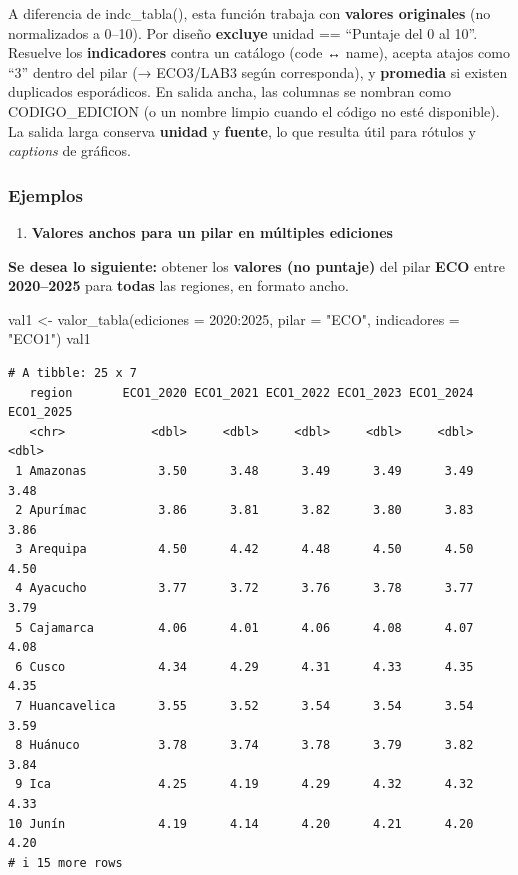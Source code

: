 \documentclass[
  11pt,
  letterpaper,
  DIV=11,
  numbers=noendperiod]{scrartcl}
\newenvironment{Shaded}{\begin{snugshade}}{\end{snugshade}}
\newcommand{\AttributeTok}[1]{\textcolor[rgb]{0.40,0.45,0.13}{#1}}
\newcommand{\DecValTok}[1]{\textcolor[rgb]{0.68,0.00,0.00}{#1}}
\newcommand{\FunctionTok}[1]{\textcolor[rgb]{0.28,0.35,0.67}{#1}}
\newcommand{\NormalTok}[1]{\textcolor[rgb]{0.00,0.23,0.31}{#1}}
\newcommand{\OtherTok}[1]{\textcolor[rgb]{0.00,0.23,0.31}{#1}}
\newcommand{\SpecialCharTok}[1]{\textcolor[rgb]{0.37,0.37,0.37}{#1}}
\newcommand{\StringTok}[1]{\textcolor[rgb]{0.13,0.47,0.30}{#1}}
\providecommand{\tightlist}{%
  \setlength{\itemsep}{0pt}\setlength{\parskip}{0pt}}\usepackage{longtable,booktabs,array}
\begin{document}
A diferencia de indc\_tabla(), esta función trabaja con \textbf{valores
originales} (no normalizados a 0--10). Por diseño \textbf{excluye}
unidad == ``Puntaje del 0 al 10''. Resuelve los \textbf{indicadores}
contra un catálogo (code ↔ name), acepta atajos como ``3'' dentro del
pilar (→ ECO3/LAB3 según corresponda), y \textbf{promedia} si existen
duplicados esporádicos. En salida ancha, las columnas se nombran como
CODIGO\_EDICION (o un nombre limpio cuando el código no esté
disponible). La salida larga conserva \textbf{unidad} y \textbf{fuente},
lo que resulta útil para rótulos y \emph{captions} de gráficos.

\subsubsection{\texorpdfstring{\textbf{Ejemplos}}{Ejemplos}}\label{ejemplos-10}

\begin{enumerate}
\def\labelenumi{\arabic{enumi}.}
\tightlist
\item
  \textbf{Valores anchos para un pilar en múltiples ediciones}
\end{enumerate}

\textbf{Se desea lo siguiente:} obtener los \textbf{valores (no
puntaje)} del pilar \textbf{ECO} entre \textbf{2020--2025} para
\textbf{todas} las regiones, en formato ancho.

\begin{Shaded}
\begin{Highlighting}[]
\NormalTok{val1 }\OtherTok{\textless{}{-}} \FunctionTok{valor\_tabla}\NormalTok{(}\AttributeTok{ediciones =} \DecValTok{2020}\SpecialCharTok{:}\DecValTok{2025}\NormalTok{, }
                    \AttributeTok{pilar =} \StringTok{"ECO"}\NormalTok{,}
                    \AttributeTok{indicadores =} \StringTok{"ECO1"}\NormalTok{)}
\NormalTok{val1}
\end{Highlighting}
\end{Shaded}

\begin{verbatim}
# A tibble: 25 x 7
   region       ECO1_2020 ECO1_2021 ECO1_2022 ECO1_2023 ECO1_2024 ECO1_2025
   <chr>            <dbl>     <dbl>     <dbl>     <dbl>     <dbl>     <dbl>
 1 Amazonas          3.50      3.48      3.49      3.49      3.49      3.48
 2 Apurímac          3.86      3.81      3.82      3.80      3.83      3.86
 3 Arequipa          4.50      4.42      4.48      4.50      4.50      4.50
 4 Ayacucho          3.77      3.72      3.76      3.78      3.77      3.79
 5 Cajamarca         4.06      4.01      4.06      4.08      4.07      4.08
 6 Cusco             4.34      4.29      4.31      4.33      4.35      4.35
 7 Huancavelica      3.55      3.52      3.54      3.54      3.54      3.59
 8 Huánuco           3.78      3.74      3.78      3.79      3.82      3.84
 9 Ica               4.25      4.19      4.29      4.32      4.32      4.33
10 Junín             4.19      4.14      4.20      4.21      4.20      4.20
# i 15 more rows
\end{verbatim}
\end{document}
